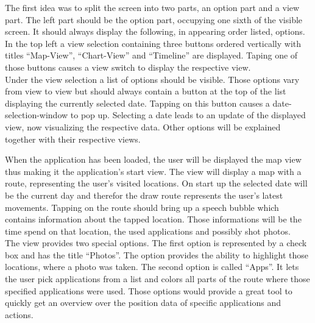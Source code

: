 The first idea was to split the screen into two parts, an option part and a view part. The left part should be the option part, occupying one sixth of the visible screen. It should always display the following, in appearing order listed, options.\\
In the top left a view selection containing three buttons  ordered vertically with titles ``Map-View'', ``Chart-View'' and ``Timeline'' are displayed. Taping one of those buttons causes a view switch to display the respective view.\\
Under the view selection a list of options should be visible. Those options vary from view to view but should always contain a button at the top of the list displaying the currently selected date. Tapping on this button causes a date-selection-window to pop up. Selecting a date leads to an update of the displayed view, now visualizing the respective data.
Other options will be explained together with their respective views.

When  the application has been loaded, the user will be displayed the map view thus making it the application's start view. The view will display a map with a route, representing the user's visited locations. On start up the selected date will be the current day and therefor the draw route represents the user's latest movements. Tapping on the route should bring up a speech bubble which contains information about the tapped location. Those informations will be the time spend on that location, the used applications and possibly shot photos.\\
The  view provides two special options. The first option is represented by a check box and has the title ``Photos''. The option provides the ability to highlight those locations, where a photo was taken. The second option is called ``Apps''. It lets the user pick applications from a list and colors all parts of the route where those specified applications were used. Those options would provide a great tool to quickly get an overview over the position data of specific applications and actions.


